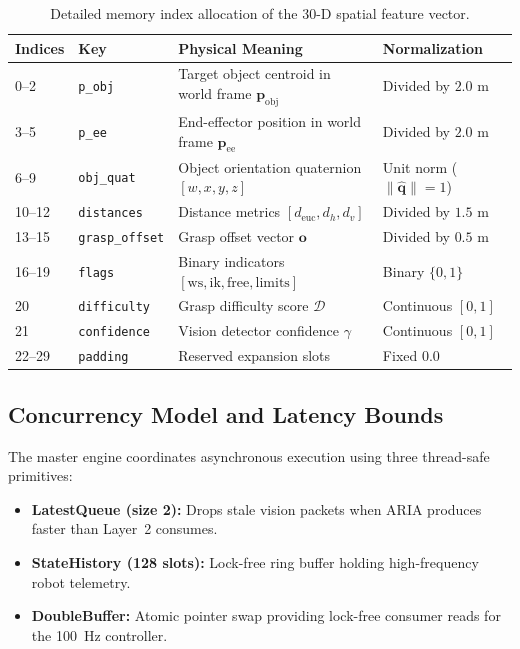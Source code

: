 \documentclass[10pt,a4paper]{article}
\begin{document}
\begin{table}[h]
\centering
\small
\begin{tabularx}{\linewidth}{p{1.6cm}p{2.6cm}Xp{3.2cm}}
\toprule
\textbf{Indices} & \textbf{Key} & \textbf{Physical Meaning} & \textbf{Normalization} \\
\midrule
0--2 & \texttt{p\_obj} & Target object centroid in world frame $\mathbf{p}_{\mathrm{obj}}$ & Divided by $2.0\text{ m}$ \\
3--5 & \texttt{p\_ee} & End-effector position in world frame $\mathbf{p}_{\mathrm{ee}}$ & Divided by $2.0\text{ m}$ \\
6--9 & \texttt{obj\_quat} & Object orientation quaternion $[w, x, y, z]$ & Unit norm ($\|\hat{\mathbf{q}}\|=1$) \\
10--12 & \texttt{distances} & Distance metrics $[d_{\mathrm{euc}}, d_h, d_v]$ & Divided by $1.5\text{ m}$ \\
13--15 & \texttt{grasp\_offset} & Grasp offset vector $\mathbf{o}$ & Divided by $0.5\text{ m}$ \\
16--19 & \texttt{flags} & Binary indicators $[\mathrm{ws}, \mathrm{ik}, \mathrm{free}, \mathrm{limits}]$ & Binary $\{0, 1\}$ \\
20 & \texttt{difficulty} & Grasp difficulty score $\mathcal{D}$ & Continuous $[0, 1]$ \\
21 & \texttt{confidence} & Vision detector confidence $\gamma$ & Continuous $[0, 1]$ \\
22--29 & \texttt{padding} & Reserved expansion slots & Fixed $0.0$ \\
\bottomrule
\end{tabularx}
\caption{Detailed memory index allocation of the 30-D spatial feature vector.}
\label{tab:layout}
\end{table}

\subsection{Concurrency Model and Latency Bounds}
The master engine coordinates asynchronous execution using three thread-safe primitives:
\begin{itemize}
    \item \textbf{LatestQueue (size 2):} Drops stale vision packets when ARIA produces faster than Layer~2 consumes.
    \item \textbf{StateHistory (128 slots):} Lock-free ring buffer holding high-frequency robot telemetry.
    \item \textbf{DoubleBuffer:} Atomic pointer swap providing lock-free consumer reads for the 100~Hz controller.
\end{itemize}
\end{document}
